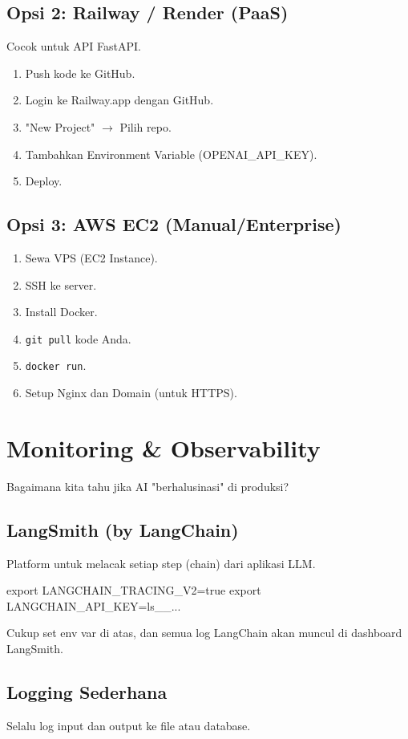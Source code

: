 \subsection{Opsi 2: Railway / Render (PaaS)}
Cocok untuk API FastAPI.
\begin{enumerate}
    \item Push kode ke GitHub.
    \item Login ke Railway.app dengan GitHub.
    \item "New Project" $\rightarrow$ Pilih repo.
    \item Tambahkan Environment Variable (OPENAI\_API\_KEY).
    \item Deploy.
\end{enumerate}

\subsection{Opsi 3: AWS EC2 (Manual/Enterprise)}
\begin{enumerate}
    \item Sewa VPS (EC2 Instance).
    \item SSH ke server.
    \item Install Docker.
    \item \texttt{git pull} kode Anda.
    \item \texttt{docker run}.
    \item Setup Nginx dan Domain (untuk HTTPS).
\end{enumerate}

\section{Monitoring \& Observability}

Bagaimana kita tahu jika AI "berhalusinasi" di produksi?

\subsection{LangSmith (by LangChain)}
Platform untuk melacak setiap step (chain) dari aplikasi LLM.
\begin{codeblock}
export LANGCHAIN_TRACING_V2=true
export LANGCHAIN_API_KEY=ls__...
\end{codeblock}
Cukup set env var di atas, dan semua log LangChain akan muncul di dashboard LangSmith.

\subsection{Logging Sederhana}
Selalu log input dan output ke file atau database.

